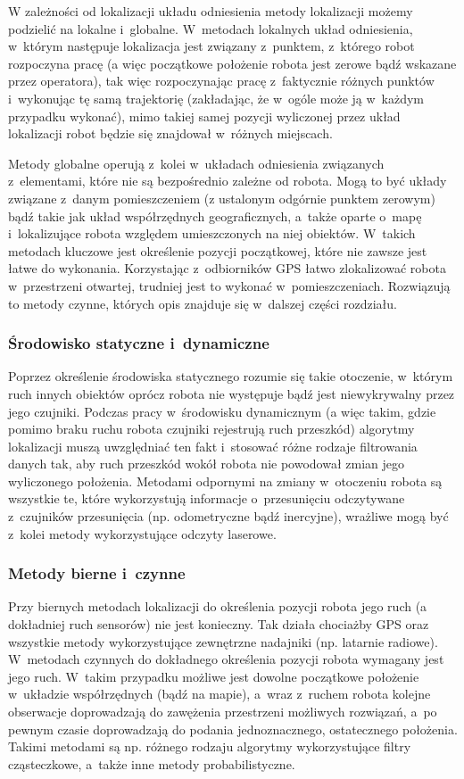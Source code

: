 W zależności od lokalizacji układu odniesienia metody lokalizacji możemy
podzielić na lokalne i~globalne. W~metodach lokalnych układ odniesienia,
w~którym następuje lokalizacja jest związany z~punktem, z~którego robot rozpoczyna
pracę (a więc początkowe położenie robota jest zerowe bądź wskazane przez
operatora), tak więc rozpoczynając pracę z~faktycznie różnych punktów
i~wykonując tę samą trajektorię (zakładając, że w~ogóle może ją w~każdym
przypadku wykonać), mimo takiej samej pozycji wyliczonej przez układ
lokalizacji robot będzie się znajdował w~różnych miejscach.

Metody globalne operują z~kolei w~układach odniesienia związanych z~elementami,
które nie są bezpośrednio zależne od robota. Mogą to być układy związane z~danym
pomieszczeniem (z ustalonym odgórnie punktem zerowym) bądź takie jak układ
współrzędnych geograficznych, a~także oparte o~mapę i~lokalizujące robota
względem umieszczonych na niej obiektów. W~takich metodach kluczowe jest
określenie pozycji początkowej, które nie zawsze jest łatwe do wykonania.
Korzystając z~odbiorników GPS łatwo zlokalizować robota w~przestrzeni otwartej,
trudniej jest to wykonać w~pomieszczeniach. Rozwiązują to metody czynne, których
opis znajduje się w~dalszej części rozdziału.

\subsubsection{Środowisko statyczne i~dynamiczne}

Poprzez określenie środowiska statycznego rozumie się takie otoczenie, w~którym
ruch innych obiektów oprócz robota nie występuje bądź jest niewykrywalny przez
jego czujniki. Podczas pracy w~środowisku dynamicznym (a więc takim, gdzie
pomimo braku ruchu robota czujniki rejestrują ruch przeszkód) algorytmy
lokalizacji muszą uwzględniać ten fakt i~stosować różne rodzaje filtrowania
danych tak, aby ruch przeszkód wokół robota nie powodował zmian jego wyliczonego
położenia. Metodami odpornymi na zmiany w~otoczeniu robota są wszystkie te,
które wykorzystują informacje o~przesunięciu odczytywane z~czujników
przesunięcia (np. odometryczne bądź inercyjne), wrażliwe mogą być z~kolei metody
wykorzystujące odczyty laserowe.

\subsubsection{Metody bierne i~czynne}

Przy biernych metodach lokalizacji do określenia pozycji robota jego ruch
(a dokładniej ruch sensorów) nie jest konieczny. Tak działa chociażby GPS oraz
wszystkie metody wykorzystujące zewnętrzne nadajniki (np. latarnie radiowe).
W~metodach czynnych do dokładnego określenia pozycji robota wymagany jest jego
ruch. W~takim przypadku możliwe jest dowolne początkowe położenie w~układzie
współrzędnych (bądź na mapie), a~wraz z~ruchem robota kolejne obserwacje
doprowadzają do zawężenia przestrzeni możliwych rozwiązań, a~po pewnym czasie
doprowadzają do podania jednoznacznego, ostatecznego położenia. Takimi metodami są np.
różnego rodzaju algorytmy wykorzystujące filtry cząsteczkowe, a~także inne
metody probabilistyczne.

